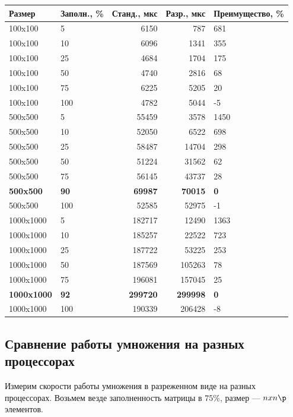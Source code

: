 \documentclass[a4paper,12pt]{extarticle}
\begin{document}
\begin{tabular}{ |l|l|r|r|l| }
\hline
\textbf{Размер} & \textbf{Заполн., \%} & \textbf{Станд., мкс} & \textbf{Разр., мкс} & \textbf{Преимущество, \%} \\ \hline
100x100 & 5 & 6150 & 787 & 681 \\ \hline
100x100 & 10 & 6096 & 1341 & 355 \\ \hline
100x100 & 25 & 4684 & 1704 & 175 \\ \hline
100x100 & 50 & 4740 & 2816 & 68 \\ \hline
100x100 & 75 & 6225 & 5205 & 20 \\ \hline
100x100 & 100 & 4782 & 5044 & -5 \\ \hline
500x500 & 5 & 55459 & 3578 & 1450 \\ \hline
500x500 & 10 & 52050 & 6522 & 698 \\ \hline
500x500 & 25 & 58487 & 14704 & 298 \\ \hline
500x500 & 50 & 51224 & 31562 & 62 \\ \hline
500x500 & 75 & 56145 & 43737 & 28 \\ \hline
\textbf{500x500} & \textbf{90} & \textbf{69987} & \textbf{70015} & \textbf{0} \\ \hline
500x500 & 100 & 52585 & 52975 & -1 \\ \hline
1000x1000 & 5 & 182717 & 12490 & 1363 \\ \hline
1000x1000 & 10 & 185257 & 22522 & 723 \\ \hline
1000x1000 & 25 & 187722 & 53225 & 253 \\ \hline
1000x1000 & 50 & 187569 & 105263 & 78 \\ \hline
1000x1000 & 75 & 196081 & 157045 & 25 \\ \hline
\textbf{1000x1000} & \textbf{92} & \textbf{299720} & \textbf{299998} & \textbf{0} \\ \hline
1000x1000 & 100 & 190339 & 206428 & -8 \\ \hline

\end{tabular}

\subsection{Сравнение работы умножения на разных процессорах}

Измерим скорости работы умножения в разреженном виде на разных процессорах. Возьмем везде заполненность матрицы в $75 \%$, размер --- $n x n\p$ элементов.
\end{document}
